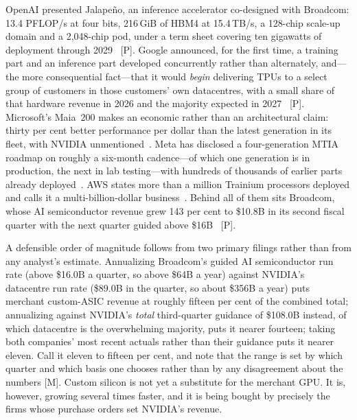 OpenAI presented Jalape\~no, an inference accelerator co-designed with Broadcom: 13.4 PFLOP/s at four bits, 216\,GiB of HBM4 at 15.4\,TB/s, a 128-chip scale-up domain and a 2{,}048-chip pod, under a term sheet covering ten gigawatts of deployment through 2029~\cite{hc2026-jalapeno,openai-broadcom} [P]. Google announced, for the first time, a training part and an inference part developed concurrently rather than alternately, and---the more consequential fact---that it would \emph{begin} delivering TPUs to a select group of customers in those customers' own datacentres, with a small share of that hardware revenue in 2026 and the majority expected in 2027~\cite{hc2026-tpu8,tpu-external} [P]. Microsoft's Maia~200 makes an economic rather than an architectural claim: thirty per cent better performance per dollar than the latest generation in its fleet, with NVIDIA unmentioned~\cite{maia200}. Meta has disclosed a four-generation MTIA roadmap on roughly a six-month cadence---of which one generation is in production, the next in lab testing---with hundreds of thousands of earlier parts already deployed~\cite{mtia400}. AWS states more than a million Trainium processors deployed and calls it a multi-billion-dollar business~\cite{trainium3}. Behind all of them sits Broadcom, whose AI semiconductor revenue grew 143 per cent to \$10.8B in its second fiscal quarter with the next quarter guided above \$16B~\cite{broadcom-q2fy26} [P].

A defensible order of magnitude follows from two primary filings rather than from any analyst's estimate. Annualizing Broadcom's guided AI semiconductor run rate (above \$16.0B a quarter, so above \$64B a year) against NVIDIA's datacentre run rate (\$89.0B in the quarter, so about \$356B a year) puts merchant custom-ASIC revenue at roughly fifteen per cent of the combined total; annualizing against NVIDIA's \emph{total} third-quarter guidance of \$108.0B instead, of which datacentre is the overwhelming majority, puts it nearer fourteen; taking both companies' most recent actuals rather than their guidance puts it nearer eleven. Call it eleven to fifteen per cent, and note that the range is set by which quarter and which basis one chooses rather than by any disagreement about the numbers [M]. Custom silicon is not yet a substitute for the merchant GPU. It is, however, growing several times faster, and it is being bought by precisely the firms whose purchase orders set NVIDIA's revenue.

